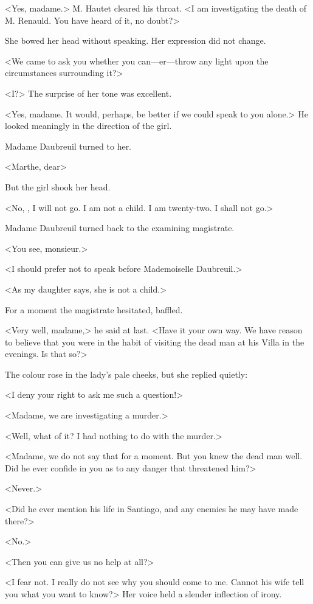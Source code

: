  <Yes, madame.> M. Hautet cleared his throat. <I am investigating the death of M. Renauld. You have heard of it, no doubt?> 

 She bowed her head without speaking. Her expression did not change. 

 <We came to ask you whether you can—er—throw any light upon the circumstances surrounding it?> 

 <I?> The surprise of her tone was excellent. 

 <Yes, madame. It would, perhaps, be better if we could speak to you alone.> He looked meaningly in the direction of the girl. 

 Madame Daubreuil turned to her. 

 <Marthe, dear\longdash> 

 But the girl shook her head. 

 <No, , I will not go. I am not a child. I am twenty-two. I shall not go.> 

 Madame Daubreuil turned back to the examining magistrate. 

 <You see, monsieur.> 

 <I should prefer not to speak before Mademoiselle Daubreuil.> 

 <As my daughter says, she is not a child.> 

 For a moment the magistrate hesitated, baffled. 

 <Very well, madame,> he said at last. <Have it your own way. We have reason to believe that you were in the habit of visiting the dead man at his Villa in the evenings. Is that so?> 

 The colour rose in the lady's pale cheeks, but she replied quietly: 

 <I deny your right to ask me such a question!> 

 <Madame, we are investigating a murder.> 

 <Well, what of it? I had nothing to do with the murder.> 

 <Madame, we do not say that for a moment. But you knew the dead man well. Did he ever confide in you as to any danger that threatened him?> 

 <Never.> 

 <Did he ever mention his life in Santiago, and any enemies he may have made there?> 

 <No.> 

 <Then you can give us no help at all?> 

 <I fear not. I really do not see why you should come to me. Cannot his wife tell you what you want to know?> Her voice held a slender inflection of irony. 

